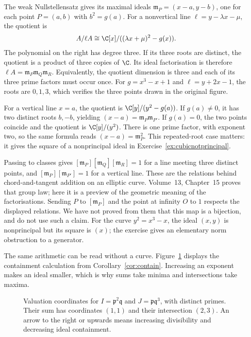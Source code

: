 The weak Nullstellensatz gives its maximal ideals $\mathfrak m_P=(x-a,y-b)$, one for each point $P=(a,b)$ with $b^2=g(a)$. For a nonvertical line $\ell=y-\lambda x-\mu$, the quotient is
\[
 A/\ell A\cong\C[x]/((\lambda x+\mu)^2-g(x)).
\]
The polynomial on the right has degree three. If its three roots are distinct, the quotient is a product of three copies of $\C$. Its ideal factorisation is therefore $\ell A=\mathfrak m_P\mathfrak m_Q\mathfrak m_R$. Equivalently, the quotient dimension is three and each of its three prime factors must occur once. For $g=x^3-x+1$ and $\ell=y+2x-1$, the roots are $0,1,3$, which verifies the three points drawn in the original figure.

For a vertical line $x=a$, the quotient is $\C[y]/(y^2-g(a))$. If $g(a)\ne0$, it has two distinct roots $b,-b$, yielding $(x-a)=\mathfrak m_P\mathfrak m_{P'}$. If $g(a)=0$, the two points coincide and the quotient is $\C[y]/(y^2)$. There is one prime factor, with exponent two, so the same formula reads $(x-a)=\mathfrak m_P^2$. This repeated-root case matters: it gives the square of a nonprincipal ideal in Exercise~\ref{ex:cubicnotprincipal}.

Passing to classes gives $[\mathfrak m_P][\mathfrak m_Q][\mathfrak m_R]=1$ for a line meeting three distinct points, and $[\mathfrak m_P][\mathfrak m_{P'}]=1$ for a vertical line. These are the relations behind chord-and-tangent addition on an elliptic curve. Volume~13, Chapter~15 proves that group law; here it is a preview of the geometric meaning of the factorisations. Sending $P$ to $[\mathfrak m_P]$ and the point at infinity $O$ to $1$ respects the displayed relations. We have not proved from them that this map is a bijection, and do not use such a claim. For the curve $y^2=x^3-x$, the ideal $(x,y)$ is nonprincipal but its square is $(x)$; the exercise gives an elementary norm obstruction to a generator.

The same arithmetic can be read without a curve. Figure~\ref{fig:v10new-ch06-valuations} displays the containment calculation from Corollary~\ref{cor:contain}. Increasing an exponent makes an ideal smaller, which is why sums take minima and intersections take maxima.

\begin{figure}[ht]
\centering
{}
\caption{Valuation coordinates for $I=\mathfrak p^2\mathfrak q$ and $J=\mathfrak p\mathfrak q^3$, with distinct primes. Their sum has coordinates $(1,1)$ and their intersection $(2,3)$. An arrow to the right or upwards means increasing divisibility and decreasing ideal containment.}
\label{fig:v10new-ch06-valuations}
\end{figure}

